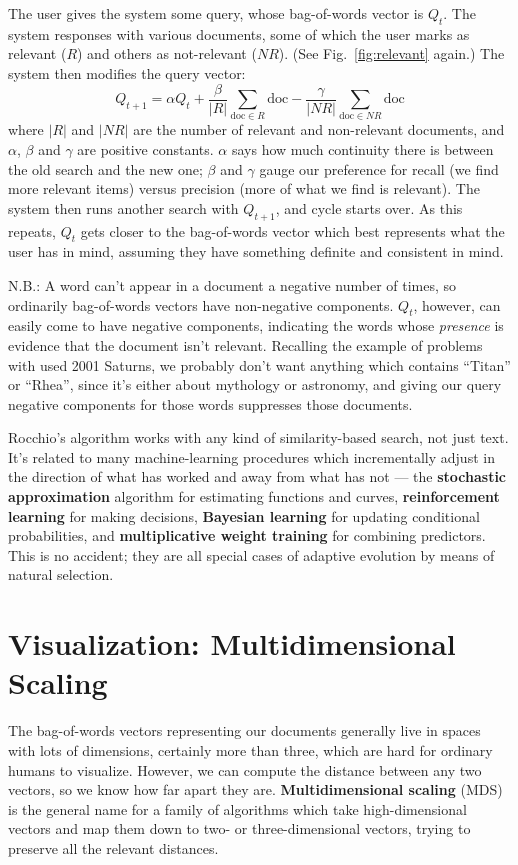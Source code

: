 \documentclass{article}
\begin{document}
The user gives the system some query, whose bag-of-words vector is $Q_t$.  The
system responses with various documents, some of which the user marks as
relevant ($R$) and others as not-relevant ($NR$).  (See Fig.\
\ref{fig:relevant} again.)  The system then modifies the query vector:
\[
Q_{t+1} = \alpha Q_t + \frac{\beta}{|R|}\sum_{\mathrm{doc} \in R}{\mathrm{doc}} - \frac{\gamma}{|NR|}\sum_{\mathrm{doc}\in NR}{\mathrm{doc}}
\]
where $|R|$ and $|NR|$ are the number of relevant and non-relevant documents,
and $\alpha$, $\beta$ and $\gamma$ are positive constants.  $\alpha$ says how
much continuity there is between the old search and the new one; $\beta$ and
$\gamma$ gauge our preference for recall (we find more relevant items) versus
precision (more of what we find is relevant).  The system then runs another
search with $Q_{t+1}$, and cycle starts over.  As this repeats, $Q_t$ gets
closer to the bag-of-words vector which best represents what the user has in
mind, assuming they have something definite and consistent in mind.

N.B.: A word can't appear in a document a negative number of times, so
ordinarily bag-of-words vectors have non-negative components.  $Q_t$, however,
can easily come to have negative components, indicating the words whose {\em
  presence} is evidence that the document isn't relevant.  Recalling the
example of problems with used 2001 Saturns, we probably don't want anything
which contains ``Titan'' or ``Rhea'', since it's either about mythology or
astronomy, and giving our query negative components for those words suppresses
those documents.

Rocchio's algorithm works with any kind of similarity-based search, not just
text.  It's related to many machine-learning procedures which incrementally
adjust in the direction of what has worked and away from what has not --- the
{\bf stochastic approximation} algorithm for estimating functions and curves,
{\bf reinforcement learning} for making decisions, {\bf Bayesian learning} for
updating conditional probabilities, and {\bf multiplicative weight training}
for combining predictors.  This is no
accident; they are all special cases of adaptive evolution by means of natural
selection.


\section{Visualization: Multidimensional Scaling}

The bag-of-words vectors representing our documents generally live in spaces
with lots of dimensions, certainly more than three, which are hard for ordinary
humans to visualize.  However, we can compute the distance between any two
vectors, so we know how far apart they are.  {\bf Multidimensional scaling}
(MDS) is the general name for a family of algorithms which take
high-dimensional vectors and map them down to two- or three-dimensional
vectors, trying to preserve all the relevant distances.
\end{document}
